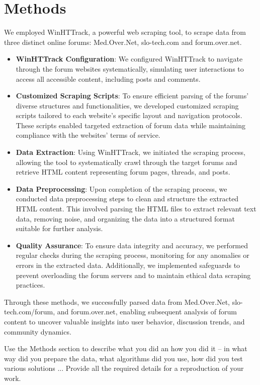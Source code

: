 \documentclass[fleqn,moreauthors,10pt]{ds_report}
\begin{document}

\section*{Methods}

We employed WinHTTrack, a powerful web scraping tool, to scrape data from three distinct online forums: Med.Over.Net, slo-tech.com and forum.over.net.


\begin{itemize}
    \item \textbf{WinHTTrack Configuration}: We configured WinHTTrack to navigate through the forum websites systematically, simulating user interactions to access all accessible content, including posts and comments.
    \item \textbf{Customized Scraping Scripts}: To ensure efficient parsing of the forums' diverse structures and functionalities, we developed customized scraping scripts tailored to each website's specific layout and navigation protocols. These scripts enabled targeted extraction of forum data while maintaining compliance with the websites' terms of service.
    \item \textbf{Data Extraction}: Using WinHTTrack, we initiated the scraping process, allowing the tool to systematically crawl through the target forums and retrieve HTML content representing forum pages, threads, and posts.
\item \textbf{Data Preprocessing}: Upon completion of the scraping process, we conducted data preprocessing steps to clean and structure the extracted HTML content. This involved parsing the HTML files to extract relevant text data, removing noise, and organizing the data into a structured format suitable for further analysis.
\item \textbf{Quality Assurance}: To ensure data integrity and accuracy, we performed regular checks during the scraping process, monitoring for any anomalies or errors in the extracted data. Additionally, we implemented safeguards to prevent overloading the forum servers and to maintain ethical data scraping practices.
\end{itemize}
Through these methods, we successfully parsed data from Med.Over.Net, slo-tech.com/forum, and forum.over.net, enabling subsequent analysis of forum content to uncover valuable insights into user behavior, discussion trends, and community dynamics.

\iffalse
Use the Methods section to describe what you did an how you did it -- in what way did you prepare the data, what algorithms did you use, how did you test various solutions ... Provide all the required details for a reproduction of your work.
\end{document}
